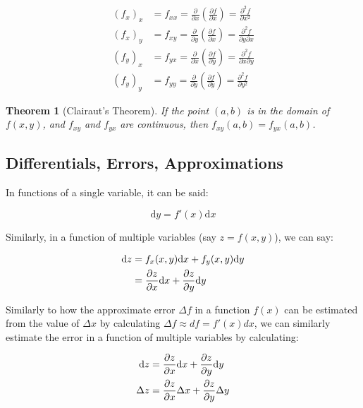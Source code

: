 \documentclass[12pt]{article}
\newtheorem*{theorem}{Theorem}
\begin{document}
\begin{equation}
    \begin{split}
      (f_x)_x &= f_{xx} = \frac{\partial}{\partial x}(\frac{\partial f}{\partial x}) = \frac{\partial^2f}{\partial x^2}\\
      (f_x)_y &= f_{xy} = \frac{\partial}{\partial y}(\frac{\partial f}{\partial x}) = \frac{\partial^2f}{\partial y \partial x}\\
    (f_y)_x &= f_{yx} = \frac{\partial}{\partial x}(\frac{\partial f}{\partial y}) = \frac{\partial^2f}{\partial x \partial y}\\
    (f_y)_y &= f_{yy} = \frac{\partial}{\partial y}(\frac{\partial f}{\partial y}) = \frac{\partial^2f}{\partial y^2}
    \end{split}
\end{equation}


\begin{theorem}[Clairaut's Theorem]
    If the point $(a,b)$ is in the domain of $f(x,y)$, and $f_{xy}$ and $f_{yx}$ are continuous, then $f_{xy}(a,b)=f_{yx}(a,b)$.
\end{theorem}

\subsection{Differentials, Errors, Approximations}

In functions of a single variable, it can be said:

\[
    \text{d}y = f'(x) \text{d}x    
\]

Similarly, in a function of multiple variables (say $z = f(x,y)$), we can say:

\begin{equation}
    \begin{split}
    \text{d}z &= f_x(x,y) \text{d}x + f_y(x,y) \text{d}y\\
    &= \frac{\partial z}{\partial x} \text{d}x + \frac{\partial z}{\partial y} \text{d}y
    \end{split}
\end{equation}

Similarly to how the approximate error $\Delta f$ in a function $f(x)$ can be estimated from the value of $\Delta x$ by calculating $\Delta f \approx df =  f'(x) dx$, we can similarly estimate the error in a function of multiple variables by calculating:

\begin{equation}
    \begin{split}
     \text{d}z &= \frac{\partial z}{\partial x} \text{d}x + \frac{\partial z}{\partial y} \text{d}y\\
    \Delta z &= \frac{\partial z}{\partial x} \Delta x + \frac{\partial z}{\partial y} \Delta y   
    \end{split}
\end{equation}
\end{document}
